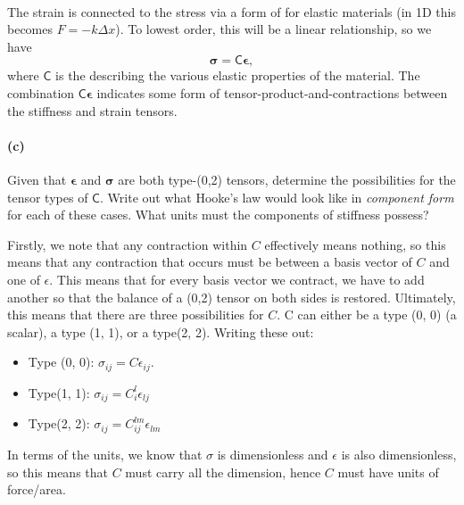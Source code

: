 \documentclass{article}
\def\stress{\boldsymbol{\sigma}}
\def\strain{\boldsymbol{\epsilon}}
\def\stiffness{\boldsymbol{\mathsf{C}}}
\begin{document}
\phline
\paragraph{}
The strain is connected to the stress via a form of  for elastic materials (in 1D this becomes $F=-k\Delta x$).  
To lowest order, this will be a linear relationship, so we have
	\begin{equation*}
		\stress = \stiffness\strain,
	\end{equation*}
where $\stiffness$ is the  describing the various elastic properties of the material.  The combination $\stiffness\strain$ indicates some form of
tensor-product-and-contractions between the stiffness and strain tensors.

\paragraph{(c)}
Given that $\strain$ and $\stress$ are both type-(0,2) tensors, determine the possibilities for the tensor types of $\stiffness$.
Write out what Hooke's law would look like in \emph{component form} for each of these cases.  What units must the components of stiffness possess?

\begin{solution}
	Firstly, we note that any contraction within $C$ effectively means nothing, so this means that any 
	contraction that occurs must be between a basis vector of $C$ and one of $\epsilon$. This means that 
	for every basis vector we contract, we have to add another so that the balance of a (0,2) tensor on both 
	sides is restored. Ultimately, this means that there are three possibilities for $C$. C can either 
	be a type (0, 0) (a scalar), a type (1, 1), or a type(2, 2). Writing these out:
	\begin{itemize}
		\item Type (0, 0): $\sigma_{ij} = C \epsilon_{ij}$.
		\item Type(1, 1): $\sigma_{ij} = C^l_i \epsilon_{lj}$
		\item Type(2, 2): $\sigma_{ij} = C^{lm}_{ij} \epsilon_{lm}$
	\end{itemize}
	In terms of the units, we know that $\sigma$ is dimensionless and $\epsilon$ is also dimensionless, so 
	this means that $C$ must carry all the dimension, hence $C$ must have units of force/area.
\end{solution}

\phline
\end{document}
